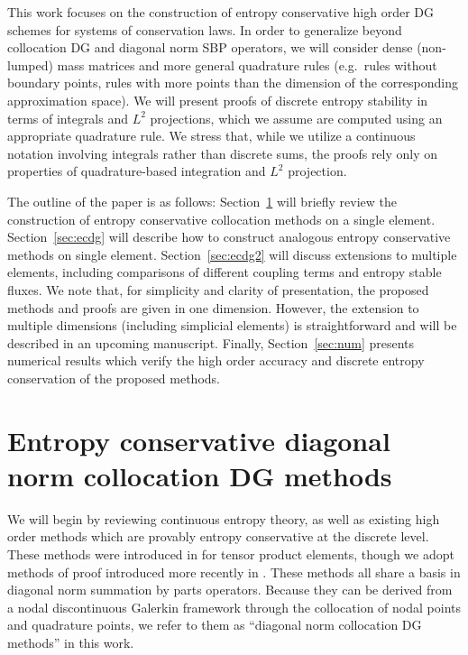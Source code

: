 \documentclass[preprint,10pt]{article}
\theoremstyle{definition}
\theoremstyle{lemma}
\theoremstyle{theorem}
\theoremstyle{assumption}
\newcommand{\note}[1]{{\color{blue}{#1}}}
\begin{document}
This work focuses on the construction of entropy conservative high order DG schemes for systems of conservation laws.  In order to generalize beyond collocation DG and diagonal norm SBP operators, we will consider dense (non-lumped) mass matrices and more general quadrature rules (e.g.\ rules without boundary points, rules with more points than the dimension of the corresponding approximation space).  We will present proofs of discrete entropy stability in terms of integrals and $L^2$ projections, which we assume are computed using an appropriate quadrature rule.  We stress that, while we utilize a continuous notation involving integrals rather than discrete sums, the proofs rely only on properties of quadrature-based integration and $L^2$ projection.  

The outline of the paper is as follows: Section~\ref{sec:intro} will briefly review the construction of entropy conservative collocation methods on a single element.  Section~\ref{sec:ecdg} will describe how to construct analogous entropy conservative methods on single element.  Section~\ref{sec:ecdg2} will discuss extensions to multiple elements, including comparisons of different coupling terms and entropy stable fluxes.  We note that, for simplicity and clarity of presentation, the proposed methods and proofs are given in one dimension.  However, the extension to multiple dimensions (including simplicial elements) is straightforward and will be described in an upcoming manuscript.  
Finally, Section~\ref{sec:num} presents numerical results which verify the high order accuracy and discrete entropy conservation of the proposed methods.  




\section{Entropy conservative diagonal norm collocation DG methods}
\label{sec:intro}

We will begin by reviewing continuous entropy theory, as well as existing high order methods which are provably entropy conservative at the discrete level.  These methods were introduced in \cite{fisher2013high, carpenter2014entropy} for tensor product elements, though we adopt methods of proof introduced more recently in \cite{gassner2017br1, chen2017entropy}.  These methods all share a basis in diagonal norm summation by parts operators.  Because they can be derived from a nodal discontinuous Galerkin framework through the collocation of nodal points and quadrature points, we refer to them as ``diagonal norm collocation DG methods'' in this work.  
\end{document}
